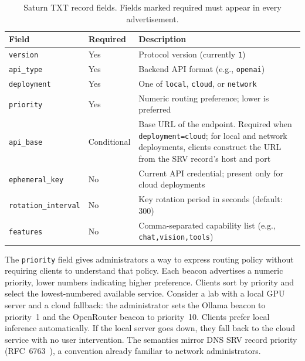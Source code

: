 \begin{table}[ht]
\centering
\caption{Saturn TXT record fields. Fields marked required must appear in every advertisement.}
\label{tab:txt-fields}
\begin{tabular}{@{}llp{2.8in}@{}}
\toprule
\textbf{Field} & \textbf{Required} & \textbf{Description} \\
\midrule
\texttt{version}           & Yes & Protocol version (currently \texttt{1}) \\
\texttt{api\_type}         & Yes & Backend API format (e.g., \texttt{openai}) \\
\texttt{deployment}        & Yes & One of \texttt{local}, \texttt{cloud}, or \texttt{network} \\
\texttt{priority}          & Yes & Numeric routing preference; lower is preferred \\
\texttt{api\_base}         & Conditional & Base URL of the endpoint. Required when \texttt{deployment=cloud}; for local and network deployments, clients construct the URL from the SRV record's host and port \\
\texttt{ephemeral\_key}    & No  & Current API credential; present only for cloud deployments \\
\texttt{rotation\_interval}& No  & Key rotation period in seconds (default: 300) \\
\texttt{features}          & No  & Comma-separated capability list (e.g., \texttt{chat,vision,tools}) \\
\toprule
\end{tabular}
\end{table}

\label{sec:priorities}
The \texttt{priority} field gives administrators a way to express routing policy without requiring clients to understand that policy. Each beacon advertises a numeric priority, lower numbers indicating higher preference. Clients sort by priority and select the lowest-numbered available service. Consider a lab with a local GPU server and a cloud fallback: the administrator sets the Ollama beacon to priority~1 and the OpenRouter beacon to priority~10. Clients prefer local inference automatically. If the local server goes down, they fall back to the cloud service with no user intervention. The semantics mirror DNS SRV record priority (RFC~6763~\cite{rfc6763}), a convention already familiar to network administrators.

